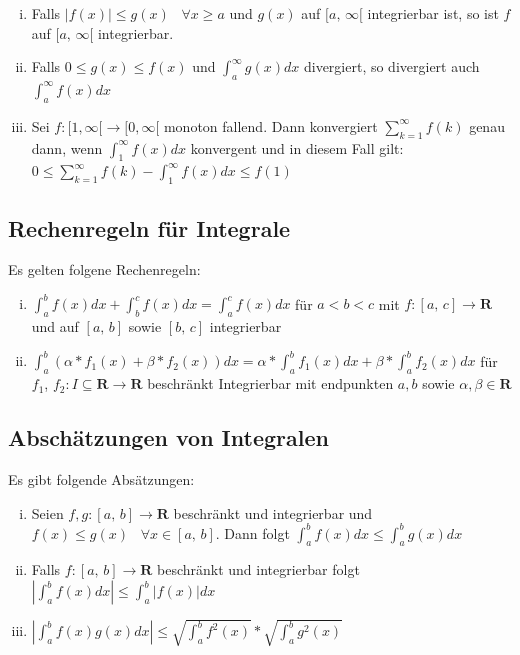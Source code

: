 \documentclass[8pt]{extarticle}
\begin{document}
\begin{multicols*}{3}
\begin{enumerate}[(i)]
  \item Falls $|f(x)| \leq g(x) \;\;\; \forall x \geq a$ und $g(x)$ auf $[a,\,\infty[$ integrierbar ist, so ist $f$ auf $[a,\,\infty[$ integrierbar.
  \item Falls $0 \leq g(x) \leq f(x)$ und $\int_a^\infty g(x) dx$ divergiert, so divergiert auch $\int_a^\infty f(x) dx$
  \item Sei $f:[1, \infty[ \rightarrow [0, \infty[$ monoton fallend. Dann konvergiert $\sum_{k = 1}^\infty f(k)$ genau dann, wenn $\int_1^\infty f(x) dx$ konvergent und in diesem
  Fall gilt: $0 \leq \sum_{k = 1}^\infty f(k) - \int_1^\infty f(x) dx \leq f(1)$
\end{enumerate}

\subsection{Rechenregeln für Integrale}

Es gelten folgene Rechenregeln:
\begin{enumerate}[(i)]
  \item $\int_a^b f(x) dx + \int_b^c f(x) dx = \int_a^c f(x) dx $ für $a < b < c$ mit $f:[a,\,c] \rightarrow \mathbf{R}$ und auf $[a,\,b]$ sowie $[b,\,c]$ integrierbar
  \item $\int_a^b(\alpha * f_1(x) + \beta * f_2(x)) dx = \alpha * \int_a^b f_1(x) dx + \beta * \int_a^b f_2(x) dx$ für $f_1$, $f_2: I \subseteq \mathbf{R} \rightarrow \mathbf{R}$ beschränkt Integrierbar mit endpunkten $a, b$ sowie $\alpha, \beta \in \mathbf{R}$
\end{enumerate}

\subsection{Abschätzungen von Integralen}

Es gibt folgende Absätzungen:
\begin{enumerate}[(i)]
  \item Seien $f, g: [a,\,b] \rightarrow \mathbf{R}$ beschränkt und integrierbar und $f(x) \leq g(x)\;\;\; \forall x \in [a,\,b]$. Dann folgt $\int_a^b f(x) dx \leq \int_a^b g(x) dx$
  \item Falls $f:[a,\,b] \rightarrow \mathbf{R}$ beschränkt und integrierbar folgt $|\int_a^b f(x) dx| \leq \int_a^b |f(x)| dx$
  \item $|\int_a^b f(x)g(x) dx| \leq \sqrt{\int_a^b f^2(x)} * \sqrt{\int_a^b g^2(x)}$
\end{enumerate}


\end{multicols*}
\end{document}
